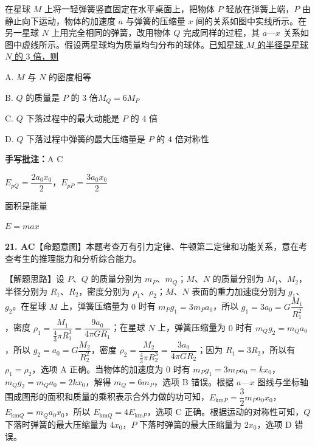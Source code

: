 \begin{problem}[剪贴印刷题]
在星球 $M$ 上将一轻弹簧竖直固定在水平桌面上，把物体 $P$ 轻放在弹簧上端，$P$ 由静止向下运动，物体的加速度 $a$ 与弹簧的压缩量 $x$ 间的关系如图中实线所示。在另一星球 $N$ 上用完全相同的弹簧，改用物体 $Q$ 完成同样的过程，其 $a$—$x$ 关系如图中虚线所示。假设两星球均为质量均匀分布的球体。\underline{已知星球 $M$ 的半径是星球 $N$ 的 $3$ 倍，则}%

A. $M$ 与 $N$ 的密度相等

B. $Q$ 的质量是 $P$ 的 $3$ 倍\quad $M_Q=6M_P$%

C. $Q$ 下落过程中的最大动能是 $P$ 的 $4$ 倍

D. $Q$ 下落过程中弹簧的最大压缩量是 $P$ 的 $4$ 倍\quad 对称性 \unclear{$\checkmark$}%

\textbf{手写批注：}A\,\,C%

$E_{pQ}=\dfrac{2a_0x_0}{2}$，\quad $E_{pP}=\dfrac{3a_0x_0}{2}$%

面积是能量

$E=max$

\begin{solution}
\textbf{21. AC}\quad 【命题意图】本题考查万有引力定律、牛顿第二定律和功能关系，意在考查考生的推理能力和分析综合能力。

【解题思路】设 $P$、$Q$ 的质量分别为 $m_P$、$m_Q$；$M$、$N$ 的质量分别为 $M_1$、$M_2$，半径分别为 $R_1$、$R_2$，密度分别为 $\rho_1$、$\rho_2$；$M$、$N$ 表面的重力加速度分别为 $g_1$、$g_2$。在星球 $M$ 上，弹簧压缩量为 $0$ 时有 $m_Pg_1=3m_Pa_0$，所以 $g_1=3a_0=G\dfrac{M_1}{R_1^2}$，密度 $\rho_1=\dfrac{M_1}{\frac{4}{3}\pi R_1^3}=\dfrac{9a_0}{4\pi GR_1}$；在星球 $N$ 上，弹簧压缩量为 $0$ 时有 $m_Qg_2=m_Qa_0$，所以 $g_2=a_0=G\dfrac{M_2}{R_2^2}$，密度 $\rho_2=\dfrac{M_2}{\frac{4}{3}\pi R_2^3}=\dfrac{3a_0}{4\pi GR_2}$；因为 $R_1=3R_2$，所以有 $\rho_1=\rho_2$，选项 A 正确。当物体的加速度为 $0$ 时有 $m_Pg_1=3m_Pa_0=kx_0$，$m_Qg_2=m_Qa_0=2kx_0$，解得 $m_Q=6m_P$，选项 B 错误。根据 $a$—$x$ 图线与坐标轴围成图形的面积和质量的乘积表示合外力做的功可知，$E_{\mathrm{km}P}=\dfrac{3}{2}m_Pa_0x_0$，$E_{\mathrm{km}Q}=m_Qa_0x_0$，所以 $E_{\mathrm{km}Q}=4E_{\mathrm{km}P}$，选项 C 正确。根据运动的对称性可知，$Q$ 下落时弹簧的最大压缩量为 $4x_0$，$P$ 下落时弹簧的最大压缩量为 $2x_0$，选项 D 错误。
\end{solution}
\end{problem}
